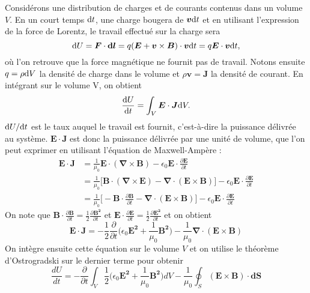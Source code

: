 Considérons une distribution de charges et de courants contenus dans un volume $V$. En un court temps $\mathrm{d} t$, une charge bougera de $\bm{v}\mathrm{d} t$ et en utilisant l'expression de la force de Lorentz, le travail effectué sur la charge sera
\begin{equation*}
\mathrm{d} U = \bm{F}\cdot\bm{\mathrm{d} l} = q(\bm{E}+\bm{v}\times\bm{B})\cdot\bm{v}\mathrm{d} t = q\bm{E}\cdot \bm{v} \mathrm{d} t,
\end{equation*}
où l'on retrouve que la force magnétique ne fournit pas de travail. Notons ensuite $q = \rho \mathrm{d} V$ la densité de charge dans le volume et $\rho \bm{v} = \bm{J}$ la densité de courant. En intégrant sur le volume V, on obtient
\begin{equation*}
\frac{\mathrm{d} U}{\mathrm{d} t} = \int_V \bm{E} \cdot \bm{J} \mathrm{d} V.
\end{equation*}
$\mathrm{d} U/\mathrm{d} t$ est le taux auquel le travail est fournit, c'est-à-dire la puissance délivrée au système. $\bm{E} \cdot \bm{J}$ est donc la puissance délivrée par une unité de volume, que l'on peut exprimer en utilisant l'équation de Maxwell-Ampère :
\begin{align*}
\bm{E} \cdot \bm{J} &= \frac{1}{\mu_0}\bm{E} \cdot (\bm{\nabla} \times \bm{B})-\epsilon_0\bm{E}\cdot\frac{\partial\bm{E}}{\partial t}\\
&= \frac{1}{\mu_0}\bigl[\bm{B} \cdot (\bm{\nabla} \times \bm{E})-\bm{\nabla} \cdot (\bm{E} \times \bm{B})\bigr]-\epsilon_0\bm{E}\cdot\frac{\partial\bm{E}}{\partial t}\\
&= \frac{1}{\mu_0}\bigl[-\bm{B} \cdot \frac{\partial\bm{B}}{\partial t}-\bm{\nabla} \cdot (\bm{E} \times \bm{B})\bigr]-\epsilon_0\bm{E}\cdot\frac{\partial\bm{E}}{\partial t}
\end{align*}
On note que $\bm{B} \cdot \frac{\partial\bm{B}}{\partial t} = \frac{1}{2}\frac{\partial\bm{B^2}}{\partial t}$ et $\bm{E} \cdot \frac{\partial\bm{E}}{\partial t} = \frac{1}{2}\frac{\partial\bm{E^2}}{\partial t}$ et on obtient
\begin{equation*}
\bm{E} \cdot \bm{J} = -\frac{1}{2}\frac{\partial}{\partial t}\biggl(\epsilon_0\bm{E^2}+\frac{1}{\mu_0}\bm{B^2}\biggl)-\frac{1}{\mu_0}\bm{\nabla} \cdot (\bm{E} \times \bm{B})
\end{equation*}
On intègre ensuite cette équation sur le volume $V$ et on utilise le théorème d'Ostrogradski sur le dernier terme pour obtenir
\begin{equation*}
\frac{dU}{dt} = -\frac{\partial}{\partial t}\int_V\frac{1}{2}\biggl(\epsilon_0\bm{E^2}+\frac{1}{\mu_0}\bm{B^2}\biggl)dV-\frac{1}{\mu_0} \oint_S(\bm{E} \times \bm{B})\cdot\bm{dS}
\end{equation*}
